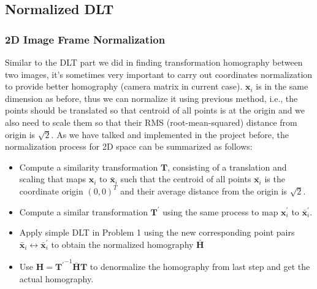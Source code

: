 \documentclass[conference]{IEEEtran}
\newcommand{\mat}[1]{\mathbf{#1}} %
\begin{document}
\subsection{Normalized DLT}
\subsubsection{2D Image Frame Normalization}
Similar to the DLT part we did in finding transformation homography between two images, it's sometimes very important to carry out coordinates normalization to provide better homography (camera matrix in current case). $\mat{x}_i$ is in the same dimension as before, thus we can normalize it using previous method, i.e., the points should be translated so that centroid of all points is at the origin and we also need to scale them so that their RMS (root-mean-squared) distance from origin is $\sqrt{2}$. 
As we have talked and implemented in the project before, the normalization process for 2D space can be summarized as follows:
\begin{itemize}
	\item Compute a similarity transformation $\mat{T}$, consisting of a translation and scaling that maps $\mat{x}_i$ to $\bar{\mat{x}}_i$ such that the centroid of all points $\bar{\mat{x}_i}$ is the coordinate origin $(0, 0)^T$ and their average distance from the origin is $\sqrt{2}$.
	\item Compute a similar transformation $\mat{T}^\prime$ using the same process to map $\mat{x}_i^\prime$ to $\bar{\mat{x}}_i^\prime$.
	\item Apply simple DLT in Problem 1 using the new corresponding point pairs $\bar{\mat{x}}_i\leftrightarrow \bar{\mat{x}}_i^\prime$ to obtain the normalized homography $\bar{\mat{H}}$
	\item Use $\mat{H} = {\mat{T}^\prime}^{-1}\bar{\mat{H}}\mat{T}$ to denormalize the homography from last step and get the actual homography.
\end{itemize}
\end{document}
